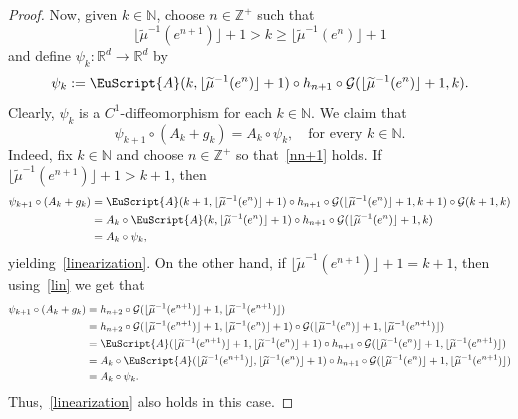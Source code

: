 \documentclass[reqno, a4paper, 10pt]{amsart}
\theoremstyle{plain}
\numberwithin{equation}{section}
\theoremstyle{remark}
\def\N{\mathbb{N}}
\def\cA{\EuScript{A}}
\def\R{\mathbb{R}}
\def\Z{\mathbb{Z}}
\begin{document}
\begin{proof}
Now, given $k\in \N$, choose $n\in \Z^+$ such that 
\begin{equation}\label{nn+1}
\lfloor\widetilde\mu^{-1}(e^{n+1})\rfloor +1>  k
\ge \lfloor\widetilde\mu^{-1}(e^n)\rfloor+1
\end{equation}
and define $\psi_k\colon \R^d \to \R^d$ by 
\begin{equation}\label{psik}
\psi_k:=\cA (k, \lfloor\widetilde\mu^{-1}(e^{n})\rfloor+1)\circ h_{n+1}\circ \mathcal G(\lfloor\widetilde\mu^{-1}(e^{n})\rfloor+1, k).
\end{equation}
Clearly, $\psi_k$ is a $C^1$-diffeomorphism for each $k\in \N$.
We claim that 
\begin{equation}\label{linearization}
    \psi_{k+1}\circ (A_k+g_k)=A_k \circ \psi_k, \quad \text{for every $k\in \N$.}
\end{equation}
Indeed, fix $k\in \N$ and choose $n\in \Z^+$ so that~\eqref{nn+1} holds. If $\lfloor\widetilde\mu^{-1}(e^{n+1})\rfloor +1>k+1$, then 
\[
\begin{split}
\psi_{k+1}\circ (A_k+g_k) &=\cA (k+1, \lfloor\widetilde\mu^{-1}(e^{n})\rfloor+1)\circ h_{n+1}\circ \mathcal G(\lfloor\widetilde\mu^{-1}(e^{n})\rfloor+1, k+1)\circ \mathcal G(k+1, k)\\
&=A_k \circ \cA (k, \lfloor\widetilde\mu^{-1}(e^{n})\rfloor+1)\circ h_{n+1}\circ \mathcal G(\lfloor\widetilde\mu^{-1}(e^{n})\rfloor+1, k) \\
&=A_k \circ \psi_k,
\end{split}
\]
yielding~\eqref{linearization}.  On the other hand, if $\lfloor\widetilde\mu^{-1}(e^{n+1})\rfloor +1=k+1$, then using~\eqref{lin} we get that 
\[
\begin{split}
\psi_{k+1}\circ (A_k+g_k) &=h_{n+2} \circ \mathcal G(\lfloor\widetilde\mu^{-1}(e^{n+1})\rfloor +1, \lfloor\widetilde\mu^{-1}(e^{n+1})\rfloor) \\
&=h_{n+2}\circ \mathcal G(\lfloor\widetilde\mu^{-1}(e^{n+1})\rfloor +1, \lfloor\widetilde\mu^{-1}(e^{n})\rfloor +1)\circ \mathcal G(\lfloor\widetilde\mu^{-1}(e^{n})\rfloor +1, \lfloor\widetilde\mu^{-1}(e^{n+1})\rfloor)\\
&=\cA (\lfloor\widetilde\mu^{-1}(e^{n+1})\rfloor +1, \lfloor\widetilde\mu^{-1}(e^{n})\rfloor +1)\circ h_{n+1}\circ \mathcal G(\lfloor\widetilde\mu^{-1}(e^{n})\rfloor +1, \lfloor\widetilde\mu^{-1}(e^{n+1})\rfloor)\\
&=A_k\circ \cA (\lfloor\widetilde\mu^{-1}(e^{n+1})\rfloor , \lfloor\widetilde\mu^{-1}(e^{n})\rfloor +1)\circ h_{n+1}\circ \mathcal G(\lfloor\widetilde\mu^{-1}(e^{n})\rfloor +1, \lfloor\widetilde\mu^{-1}(e^{n+1})\rfloor)\\
&=A_k\circ \psi_k.
\end{split}
\]
Thus,~\eqref{linearization} also holds in this case.


\end{proof}
\end{document}
